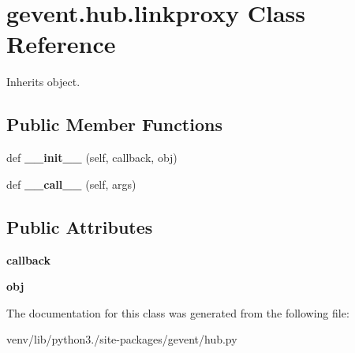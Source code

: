 \hypertarget{classgevent_1_1hub_1_1linkproxy}{}\section{gevent.\+hub.\+linkproxy Class Reference}
\label{classgevent_1_1hub_1_1linkproxy}


Inherits object.

\subsection*{Public Member Functions}
\begin{DoxyCompactItemize}
\item 
\mbox{\label{classgevent_1_1hub_1_1linkproxy_a122efed776ba875329b0dfbd50e79340}} 
def {\bfseries \+\_\+\+\_\+init\+\_\+\+\_\+} (self, callback, obj)
\item 
\mbox{\label{classgevent_1_1hub_1_1linkproxy_ab3c3e9d7a1e2a8c2b441ff538feee79c}} 
def {\bfseries \+\_\+\+\_\+call\+\_\+\+\_\+} (self, args)
\end{DoxyCompactItemize}
\subsection*{Public Attributes}
\begin{DoxyCompactItemize}
\item 
\mbox{\label{classgevent_1_1hub_1_1linkproxy_aac39aa4afcd7026522ce96a8aed72700}} 
{\bfseries callback}
\item 
\mbox{\label{classgevent_1_1hub_1_1linkproxy_ae2c4dff49f7a56514dd883166d7b189c}} 
{\bfseries obj}
\end{DoxyCompactItemize}


The documentation for this class was generated from the following file\+:\begin{DoxyCompactItemize}
\item 
venv/lib/python3./site-\/packages/gevent/hub.\+py\end{DoxyCompactItemize}
